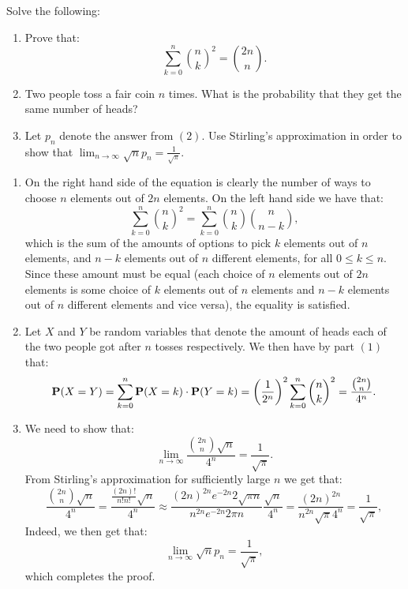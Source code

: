 \documentclass[11pt,a4paper]{article}
\begin{document}
\begin{exercise}
  Solve the following:
  \begin{enumerate}
    \item[(1)] Prove that:
      \[
        \sum_{k=0}^{n} \binom{n}{k}^2 =
        \binom{2n}{n}.
      \]
    \item[(2)] Two people toss a fair coin $n$ times. 
      What is the probability that they get the same number of heads?
    \item[(3)] Let $p_n$ denote the answer from $(2)$.
      Use Stirling's approximation in order to show that
      $\lim_{n \to \infty} \sqrt{n} p_n = \frac{1}{\sqrt{\pi}}$.
  \end{enumerate}
\end{exercise}
\begin{solution} \phantom{}
  \begin{enumerate}
    \item[(1)] On the right hand side of the equation
      is clearly the number of ways to choose $n$ elements
      out of $2n$ elements.
      On the left hand side we have that:
      \[
        \sum_{k=0}^{n} \binom{n}{k}^2 =
        \sum_{k=0}^{n} \binom{n}{k}\binom{n}{n - k},
      \]
      which is the sum of the amounts of options to pick $k$
      elements out of $n$ elements, and $n-k$ elements out of $n$ different
      elements, for all $0 \le k \le n$.
      Since these amount must be equal (each choice of $n$ elements
      out of $2n$ elements is some choice of $k$ elements out of $n$
      elements and $n-k$ elements out of $n$ different elements and
      vice versa), the equality is satisfied.
    \item[(2)] Let $X$ and $Y$ be random variables that denote
      the amount of heads each of the two people got after $n$ tosses
      respectively.
      We then have by part $(1)$ that:
      \[
        \Prob(X = Y) =
        \sum_{k=0}^{n} \Prob(X = k) \cdot \Prob(Y = k) =
        \del{\frac{1}{2^n}}^2 \sum_{k=0}^{n} \binom{n}{k}^2 =
        \frac{\binom{2n}{n}}{4^{n}}.
      \]
    \item[(3)] We need to show that:
      \[
        \lim_{n \to \infty} \frac{\binom{2n}{n}\sqrt{n}}{4^{n}} = \frac{1}{\sqrt{\pi}}.
      \]
      From Stirling's approximation for sufficiently large $n$ we get
      that:
      \[
        \frac{\binom{2n}{n}\sqrt{n}}{4^{n}} =
        \frac{\frac{(2n)!}{n!n!}\sqrt{n}}{4^{n}} \approx
        \frac{(2n)^{2n} e^{-2n} 2\sqrt{\pi n}}{n^{2n} e^{-2n}2\pi n}
        \frac{\sqrt{n}}{4^{n}} =
        \frac{(2n)^{2n} }{n^{2n} \sqrt{\pi} 4^{n}} =
        \frac{1}{\sqrt{\pi}},
      \]
      Indeed, we then get that:
      \[
        \lim_{n \to \infty} \sqrt{n} p_n =
        \frac{1}{\sqrt{\pi}},
      \]
      which completes the proof.
  \end{enumerate}
\end{solution}
\end{document}
